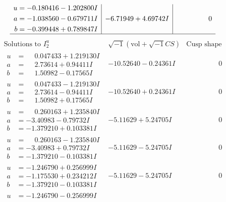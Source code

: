 \documentclass[1p]{elsarticle_modified}
\theoremstyle{definition}
\newcommand{\I}{\sqrt{-1}}
\begin{document}
$$\begin{array}{c|c|c}
\begin{aligned}
u &= -0.180416 - 1.202800 I \\
a &= -1.038560 - 0.679711 I \\
b &= -0.399448 + 0.789847 I\end{aligned}
 & -6.71949 + 4.69742 I & \phantom{-0.000000 } 0\\
 \hline 
 \end{array}$$\newpage$$\begin{array}{c|c|c}  
\text{Solutions to }I^u_{2}& \I (\text{vol} + \sqrt{-1}CS) & \text{Cusp shape}\\
 \hline 
\begin{aligned}
u &= \phantom{-}0.047433 + 1.219130 I \\
a &= \phantom{-}2.73614 + 0.94411 I \\
b &= \phantom{-}1.50982 - 0.17565 I\end{aligned}
 & -10.52640 - 0.24361 I & \phantom{-0.000000 } 0 \\ \hline\begin{aligned}
u &= \phantom{-}0.047433 - 1.219130 I \\
a &= \phantom{-}2.73614 - 0.94411 I \\
b &= \phantom{-}1.50982 + 0.17565 I\end{aligned}
 & -10.52640 + 0.24361 I & \phantom{-0.000000 } 0 \\ \hline\begin{aligned}
u &= \phantom{-}0.260163 + 1.235840 I \\
a &= -3.40983 - 0.79732 I \\
b &= -1.379210 + 0.103381 I\end{aligned}
 & -5.11629 + 5.24705 I & \phantom{-0.000000 } 0 \\ \hline\begin{aligned}
u &= \phantom{-}0.260163 - 1.235840 I \\
a &= -3.40983 + 0.79732 I \\
b &= -1.379210 - 0.103381 I\end{aligned}
 & -5.11629 - 5.24705 I & \phantom{-0.000000 } 0 \\ \hline\begin{aligned}
u &= -1.246790 + 0.256999 I \\
a &= -1.175530 + 0.234212 I \\
b &= -1.379210 - 0.103381 I\end{aligned}
 & -5.11629 - 5.24705 I & \phantom{-0.000000 } 0 \\ \hline\begin{aligned}
u &= -1.246790 - 0.256999 I \\

\end{aligned}
\end{array}$$
\end{document}
